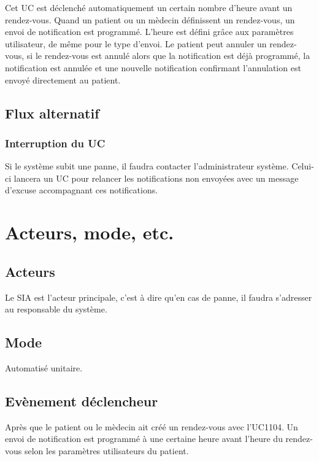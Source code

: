 \documentclass[a4paper, 11pt]{report}
\begin{document}
Cet UC est déclenché automatiquement un certain nombre d'heure avant un rendez-vous. Quand un patient ou un mèdecin
définissent un rendez-vous, un envoi de notification est programmé. L'heure est défini grâce aux paramètres utilisateur, de même
pour le type d'envoi. Le patient peut annuler un rendez-vous, si le rendez-vous est annulé alors que la notification est déjà
programmé, la notification est annulée et une nouvelle notification confirmant l'annulation est envoyé directement au 
patient.

\subsection{Flux alternatif}

\subsubsection{Interruption du UC}

Si le système subit une panne, il faudra contacter l'administrateur système.
Celui-ci lancera un UC pour relancer les notifications non envoyées avec un message d'excuse accompagnant ces
notifications.


\section{Acteurs, mode, etc.}

\subsection{Acteurs}

Le SIA est l'acteur principale, c'est à dire qu'en cas de panne, il faudra s'adresser au 
responsable du système.

\subsection{Mode}

Automatisé unitaire.

\subsection{Evènement déclencheur}

Après que le patient ou le mèdecin ait créé un rendez-vous avec l'UC1104. 
Un envoi de notification est programmé à une certaine heure avant l'heure du rendez-vous selon les 
paramètres utilisateurs du patient.
\end{document}
